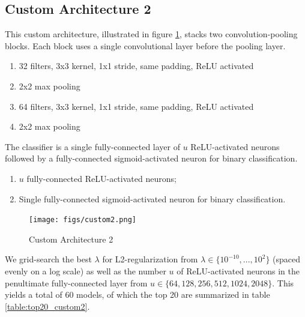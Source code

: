 \subsection{Custom Architecture 2}

This custom architecture, illustrated in figure \ref{fig:custom2}, stacks two convolution-pooling blocks. Each block uses a single convolutional layer before the pooling layer.

\begin{enumerate}
    \item 32 filters, 3x3 kernel, 1x1 stride, same padding, ReLU activated
    \item 2x2 max pooling
    \item 64 filters, 3x3 kernel, 1x1 stride, same padding, ReLU activated
    \item 2x2 max pooling
\end{enumerate}

The classifier is a single fully-connected layer of $u$ ReLU-activated neurons followed by a fully-connected sigmoid-activated neuron for binary classification.

\begin{enumerate}
    \item $u$ fully-connected ReLU-activated neurons;
    \item Single fully-connected sigmoid-activated neuron for binary classification.
\end{enumerate}

\begin{figure}[ht]
    \centering
    \texttt{[image: figs/custom2.png]}
    \caption{Custom Architecture 2}
    \label{fig:custom2}
\end{figure}

We grid-search the best $\lambda$ for L2-regularization from $\lambda \in \{10^{-10}, ..., 10^{2}\}$ (spaced evenly on a log scale) as well as the number $u$ of ReLU-activated neurons in the penultimate fully-connected layer from $u \in \{ 64, 128, 256, 512, 1024, 2048 \}$. This yields a total of $60$ models, of which the top 20 are summarized in table \ref{table:top20_custom2}.

